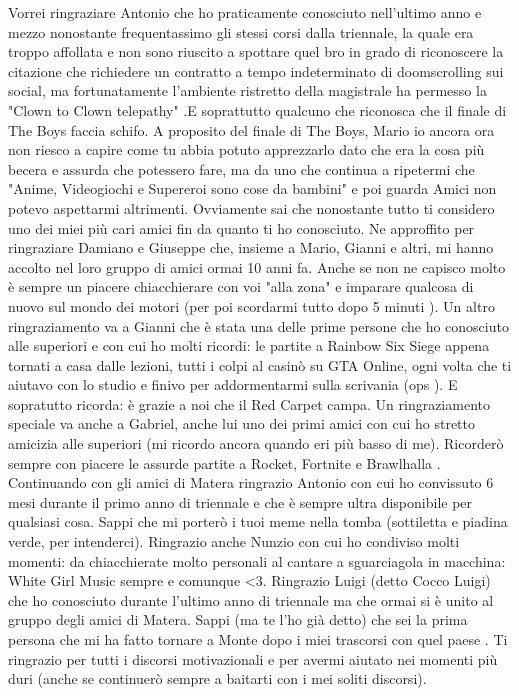 Vorrei ringraziare Antonio che ho praticamente conosciuto nell'ultimo anno e mezzo nonostante frequentassimo gli stessi corsi dalla triennale, la quale era troppo affollata e non sono riuscito a spottare quel bro in grado di riconoscere la citazione che richiedere un contratto a tempo indeterminato di doom\-scrolling sui social, ma fortunatamente l'ambiente ristretto della magistrale ha permesso la "Clown to Clown telepathy" .E soprattutto qualcuno che riconosca che il finale di The Boys faccia schifo. A proposito del finale di The Boys, Mario io ancora ora non riesco a capire come tu abbia potuto apprezzarlo dato che era la cosa più becera e assurda che potessero fare, ma da uno che continua a ripetermi che "Anime, Videogiochi e Supereroi sono cose da bambini" e poi guarda Amici non potevo aspettarmi altrimenti. Ovviamente sai che nonostante tutto ti considero uno dei miei più cari amici fin da quanto ti ho conosciuto. Ne approffito per ringraziare Damiano e Giuseppe che, insieme a Mario, Gianni e altri, mi hanno accolto nel loro gruppo di amici ormai 10 anni fa. Anche se non ne capisco molto è sempre un piacere chiacchierare con voi "alla zona" e imparare qualcosa di nuovo sul mondo dei motori (per poi scordarmi tutto dopo 5 minuti ). Un altro ringraziamento va a Gianni che è stata una delle prime persone che ho conosciuto alle superiori e con cui ho molti ricordi: le partite a Rainbow Six Siege appena tornati a casa dalle lezioni, tutti i colpi al casinò su GTA Online, ogni volta che ti aiutavo con lo studio e finivo per addormentarmi sulla scrivania (ops ). E sopratutto ricorda: è grazie a noi che il Red Carpet campa. Un ringraziamento speciale va anche a Gabriel, anche lui uno dei primi amici con cui ho stretto amicizia alle superiori (mi ricordo ancora quando eri più basso di me). Ricorderò sempre con piacere le assurde partite a Rocket, Fortnite e Brawlhalla . Continuando con gli amici di Matera ringrazio Antonio con cui ho convissuto 6 mesi durante il primo anno di triennale e che è sempre ultra disponibile per qualsiasi cosa. Sappi che mi porterò i tuoi meme nella tomba (sottiletta e piadina verde, per intenderci). Ringrazio anche Nunzio con cui ho condiviso molti momenti: da chiacchierate molto personali al cantare a sguarciagola in macchina: White Girl Music sempre e comunque <3. Ringrazio Luigi (detto Cocco Luigi) che ho conosciuto durante l'ultimo anno di triennale ma che ormai si è unito al gruppo degli amici di Matera. Sappi (ma te l'ho già detto) che sei la prima persona che mi ha fatto tornare a Monte dopo i miei trascorsi con quel paese . Ti ringrazio per tutti i discorsi motivazionali e per avermi aiutato nei momenti più duri (anche se continuerò sempre a baitarti con i mei soliti discorsi).
